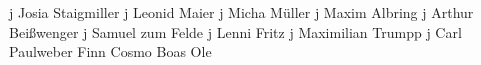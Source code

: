 j	Josia		Staigmiller
j	Leonid		Maier
j	Micha		Müller
j	Maxim		Albring
j	Arthur 		Beißwenger
j	Samuel		zum Felde
j	Lenni		Fritz
j	Maximilian	Trumpp
j	Carl 		Paulweber
	Finn
	Cosmo
	Boas
	Ole
